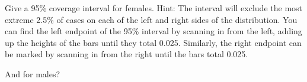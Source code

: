 Give a 95\% coverage interval for females.  Hint: The interval will
exclude the most extreme 2.5\% of cases on each of the left and right
sides of the distribution.  You can find the left endpoint of the 95\%
interval by scanning in from the left, adding up the heights of the
bars until they total 0.025.  Similarly, the right endpoint can be
marked by scanning in from the right until the bars total 0.025.
\begin{MultipleChoice}
\end{MultipleChoice}

\bigskip
\noindent And for males?
\begin{MultipleChoice}
\end{MultipleChoice}


